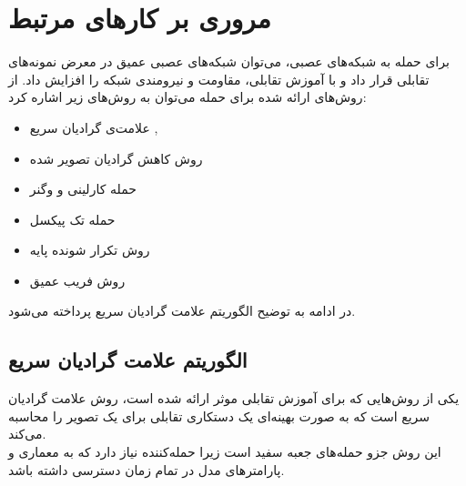 \chapter{مروری بر کار‌های مرتبط}
\thispagestyle{empty}

برای حمله به شبکه‌های عصبی، می‌توان شبکه‌های عصبی عمیق در معرض نمونه‌های تقابلی قرار داد و با آموزش تقابلی، مقاومت
و نیرومندی شبکه را افزایش داد. از روش‌های ارائه شده برای حمله می‌توان به روش‌های زیر اشاره کرد:
\begin{itemize}
	\item
	علامت‌ی گرادیان سریع
	 \cite{Goodfellow2015ExplainingAH}, \cite{Kurakin2017AdversarialEI}
	
	\item
	روش کاهش گرادیان تصویر شده 
	 \cite{Kurakin2017AdversarialML}
	
	\item
	حمله کارلینی و وگنر
	 \cite{Carlini2017TowardsET}
	
	\item
	حمله تک پیکسل
	 \cite{Su2019OnePA}
	
	\item
	روش تکرار شونده پایه
	 \cite{Kurakin2017AdversarialEI}
	
	\item
	روش فریب عمیق
	 \cite{MoosaviDezfooli2016DeepFoolAS}
\end{itemize}
در ادامه به توضیح الگوریتم علامت گرادیان سریع پرداخته ‌می‌شود.

\section{الگوریتم علامت گرادیان سریع}
یکی از روش‌هایی که برای آموزش تقابلی موثر ارائه شده است، روش علامت گرادیان سریع است 
\cite{Goodfellow2015ExplainingAH}
که به صورت بهینه‌ای یک دستکاری تقابلی برای یک تصویر را محاسبه می‌کند.
\\
این روش جزو حمله‌های جعبه سفید است زیرا حمله‌کننده
نیاز دارد که به معماری و پارامتر‌های مدل در تمام زمان دسترسی داشته باشد.

